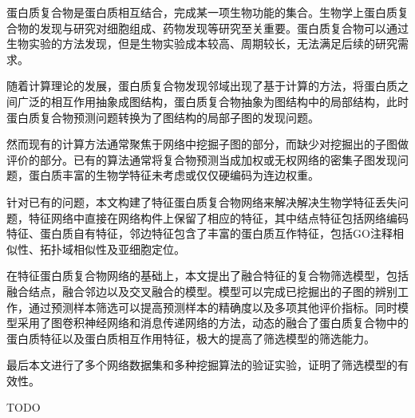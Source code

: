 \tongjisetup{
  secretlevel={保密},
  secretyear={2},
  ctitle={蛋白质复合物筛选模型研究},
  cheadingtitle={蛋白质复合物筛选模型研究},    %
  cauthor={高盼},
  studentnumber={1830801},
  cmajorfirst={工学},
  cmajorsecond={计算机科学与技术},
  cdepartment={电子与信息工程学院},
  csupervisor={关佶红 教授},
  etitle={English Title},
  eauthor={GAO PAN},
  emajorfirst={TODO},
  emajorsecond={TODO},
  edepartment={TODO},
  esupervisor={TODO}
}
\begin{cabstract}
  蛋白质复合物是蛋白质相互结合，完成某一项生物功能的集合。生物学上蛋白质复合物的发现与研究对细胞组成、药物发现等研究至关重要。蛋白质复合物可以通过生物实验的方法发现，但是生物实验成本较高、周期较长，无法满足后续的研究需求。
  
  随着计算理论的发展，蛋白质复合物发现邻域出现了基于计算的方法，将蛋白质之间广泛的相互作用抽象成图结构，蛋白质复合物抽象为图结构中的局部结构，此时蛋白质复合物预测问题转换为了图结构的局部子图的发现问题。

  然而现有的计算方法通常聚焦于网络中挖掘子图的部分，而缺少对挖掘出的子图做评价的部分。已有的算法通常将复合物预测当成加权或无权网络的密集子图发现问题，蛋白质丰富的生物学特征未考虑或仅仅硬编码为连边权重。

  针对已有的问题，本文构建了特征蛋白质复合物网络来解决解决生物学特征丢失问题，特征网络中直接在网络构件上保留了相应的特征，其中结点特征包括网络编码特征、蛋白质自有特征，邻边特征包含了丰富的蛋白质互作特征，包括GO注释相似性、拓扑域相似性及亚细胞定位。
  
  在特征蛋白质复合物网络的基础上，本文提出了融合特征的复合物筛选模型，包括融合结点，融合邻边以及交叉融合的模型。模型可以完成已挖掘出的子图的辨别工作，通过预测样本筛选可以提高预测样本的精确度以及多项其他评价指标。同时模型采用了图卷积神经网络和消息传递网络的方法，动态的融合了蛋白质复合物中的蛋白质特征以及蛋白质相互作用特征，极大的提高了筛选模型的筛选能力。
  
  最后本文进行了多个网络数据集和多种挖掘算法的验证实验，证明了筛选模型的有效性。
\end{cabstract}


\begin{eabstract}
  TODO
\end{eabstract}

